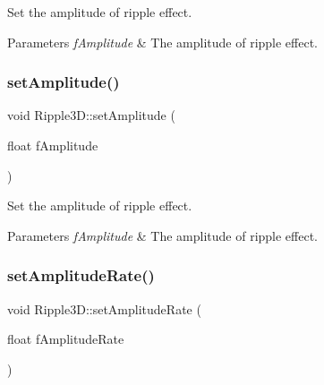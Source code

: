 Set the amplitude of ripple effect. 


\begin{DoxyParams}{Parameters}
{\em f\+Amplitude} & The amplitude of ripple effect. \\
\hline
\end{DoxyParams}
\mbox{\label{classRipple3D_ad31bc9587e1562638c3ce843376fb68b}} 
\subsubsection{\texorpdfstring{set\+Amplitude()}{setAmplitude()}\hspace{0.1cm}{\footnotesize\ttfamily [2/2]}}
{\footnotesize\ttfamily void Ripple3\+D\+::set\+Amplitude (\begin{DoxyParamCaption}\item[{float}]{f\+Amplitude }\end{DoxyParamCaption})\hspace{0.3cm}{\ttfamily [inline]}}



Set the amplitude of ripple effect. 


\begin{DoxyParams}{Parameters}
{\em f\+Amplitude} & The amplitude of ripple effect. \\
\hline
\end{DoxyParams}
\mbox{\label{classRipple3D_a328b21e3d9d03027cd9bcb7873b77b2d}} 
\subsubsection{\texorpdfstring{set\+Amplitude\+Rate()}{setAmplitudeRate()}\hspace{0.1cm}{\footnotesize\ttfamily [1/2]}}
{\footnotesize\ttfamily void Ripple3\+D\+::set\+Amplitude\+Rate (\begin{DoxyParamCaption}\item[{float}]{f\+Amplitude\+Rate }\end{DoxyParamCaption})\hspace{0.3cm}{\ttfamily [inline]}}



